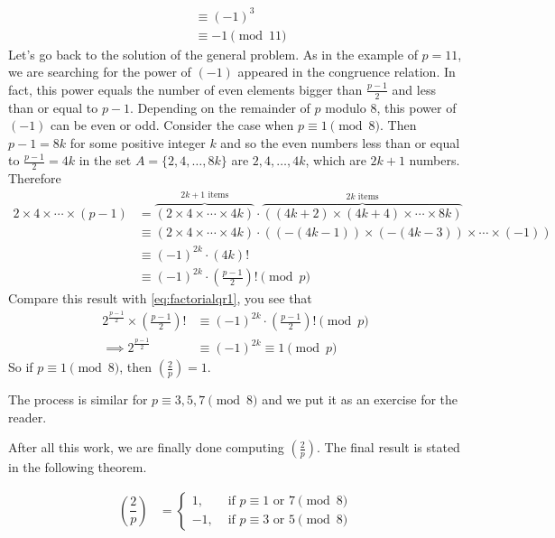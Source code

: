 \begin{solution}
\begin{align*}
		& \equiv (-1)^3\\
		& \equiv -1 \pmod{11}
	\end{align*}
	Let's go back to the solution of the general problem. As in the example of $p=11$, we are searching for the power of $(-1)$ appeared in the congruence relation. In fact, this power equals the number of even elements bigger than $ \frac{p-1}{2}$ and less than or equal to $p-1$. Depending on the remainder of $p$ modulo $8$, this power of $(-1)$ can be even or odd. Consider the case when $p \equiv 1 \pmod 8$. Then $p-1 = 8k$ for some positive integer $k$ and so the even numbers less than or equal to $\frac{p-1}{2} = 4k$ in the set $A=\{2,4,\ldots,8k\}$ are $2,4,\ldots,4k$, which are $2k+1$ numbers. Therefore
		\begin{align*}
			2 \times 4 \times \cdots \times (p-1)
				&= \overbrace{\left(2 \times 4 \times \cdots \times 4k\right)}^{2k+1 \text{ items}} \cdot \overbrace{\left((4k+2) \times (4k+4) \times \cdots \times 8k\right)}^{2k \text{ items}}\\
				& \equiv \left(2 \times 4 \times \cdots \times 4k\right) \cdot \left((-(4k-1)) \times (-(4k-3)) \times \cdots \times (-1)\right) \\
				& \equiv (-1)^{2k} \cdot (4k)!\\
				& \equiv (-1)^{2k} \cdot \left(\frac{p-1}{2}\right)! \pmod p
		\end{align*}
	Compare this result with \eqref{eq:factorialqr1}, you see that
		\begin{align*}
			2^\frac{p-1}{2} \times \left(\frac{p-1}{2}\right)!
				& \equiv (-1)^{2k} \cdot \left(\frac{p-1}{2}\right)! \pmod p\\
			\implies 2^\frac{p-1}{2}
				& \equiv (-1)^{2k} \equiv 1 \pmod p
		\end{align*}
	So if $p \equiv 1 \pmod 8$, then $ \left(\frac{2}{p}\right)=1$.

	The process is similar for $p \equiv 3, 5, 7 \pmod 8$ and we put it as an exercise for the reader.

	After all this work, we are finally done computing $ \left(\frac{2}{p}\right)$. The final result is stated in the following theorem.

	\begin{theorem}\label{thm:2qr}
		\begin{align*}
		\left(\dfrac{2}{p}\right)
		& =
		\begin{cases}
		1,&\mbox{ if } p \equiv 1 \mbox{ or } 7\pmod 8\\
		-1,&\mbox{ if } p \equiv 3 \mbox{ or } 5\pmod 8
		\end{cases}
		\end{align*}
	\end{theorem}

\end{solution}
